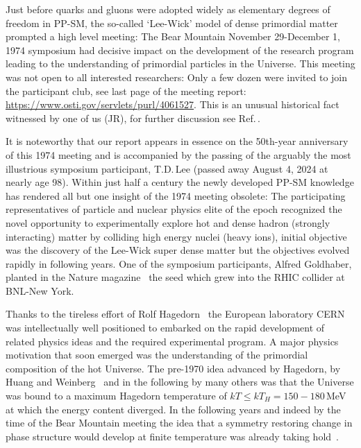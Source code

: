  Just before quarks and gluons were adopted widely as elementary degrees of freedom in PP-SM, the so-called `Lee-Wick' model of dense primordial matter prompted a high level meeting: The Bear Mountain November 29-December 1, 1974 symposium had decisive impact on the development of the research program leading to the understanding of primordial particles in the Universe. This meeting was not open to all interested researchers: Only a few dozen were invited to join the participant club, see last page of the meeting report: \url{https://www.osti.gov/servlets/purl/4061527}. This is an unusual historical fact witnessed by one of us (JR), for further discussion see Ref.\,\cite{Rafelski:2019twp}. 

It is noteworthy that our report appears in essence on the 50th-year anniversary of this 1974 meeting and is accompanied by the passing of the arguably the most illustrious symposium participant, T.D.\,Lee (passed away August 4, 2024 at nearly age 98). Within just half a century the newly developed PP-SM knowledge has rendered all but one insight of the 1974 meeting obsolete: The participating representatives of particle and nuclear physics elite of the epoch recognized the novel opportunity to experimentally explore hot and dense hadron (strongly interacting) matter by colliding high energy nuclei (heavy ions), initial objective was the discovery of the Lee-Wick super dense matter but the objectives evolved rapidly in following years. One of the symposium participants, Alfred Goldhaber, planted in the Nature magazine~\cite{Goldhaber:1978qp} the seed which grew into the RHIC collider at BNL-New York. 

 Thanks to the tireless effort of Rolf Hagedorn~\cite{Rafelski:2016hnq} the European laboratory CERN was intellectually well positioned to embarked on the rapid development of related physics ideas and the required experimental program. A major physics motivation that soon emerged was the understanding of the primordial composition of the hot Universe. The pre-1970 idea advanced by Hagedorn, by Huang and Weinberg~\cite{Huang:1970iq} and in the following by many others was that the Universe was bound to a maximum Hagedorn temperature of $kT\le kT_H=150-180$\,MeV at which the energy content diverged. In the following years and indeed by the time of the Bear Mountain meeting the idea that a symmetry restoring change in phase structure would develop at finite temperature was already taking hold~\cite{Weinberg:1974hy,Harrington:1974fc}.


